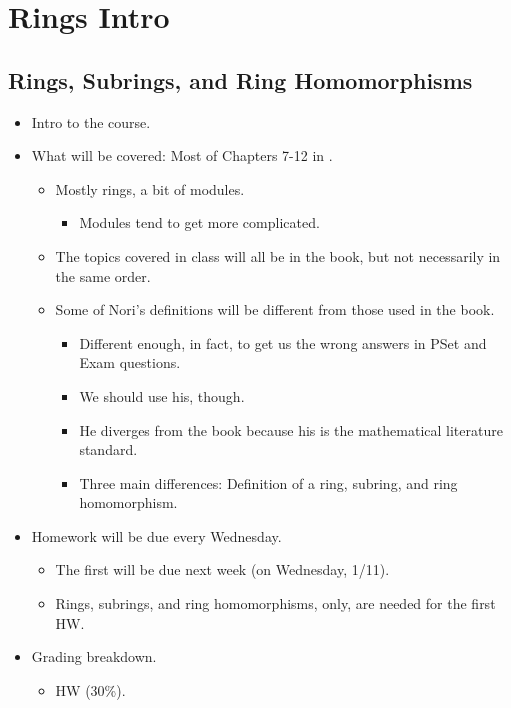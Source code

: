 \documentclass[../notes.tex]{subfiles}
\begin{document}
\chapter{Rings Intro}
\section{Rings, Subrings, and Ring Homomorphisms}
\begin{itemize}
    \item {}Intro to the course.
    \item What will be covered: Most of Chapters 7-12 in \textcite{bib:DummitFoote}.
    \begin{itemize}
        \item Mostly rings, a bit of modules.
        \begin{itemize}
            \item Modules tend to get more complicated.
        \end{itemize}
        \item The topics covered in class will all be in the book, but not necessarily in the same order.
        \item Some of Nori's definitions will be different from those used in the book.
        \begin{itemize}
            \item Different enough, in fact, to get us the wrong answers in PSet and Exam questions.
            \item We should use his, though.
            \item He diverges from the book because his is the mathematical literature standard.
            \item Three main differences: Definition of a ring, subring, and ring homomorphism.
        \end{itemize}
    \end{itemize}
    \item Homework will be due every Wednesday.
    \begin{itemize}
        \item The first will be due next week (on Wednesday, 1/11).
        \item Rings, subrings, and ring homomorphisms, only, are needed for the first HW.
    \end{itemize}
    \item Grading breakdown.
    \begin{itemize}
        \item HW (30\%).

\end{itemize}
\end{itemize}
\end{document}

